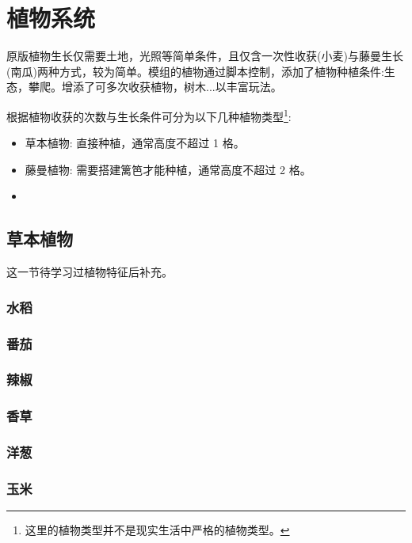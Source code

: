 \section{植物系统}

原版植物生长仅需要土地，光照等简单条件，且仅含一次性收获(小麦)与藤曼生长(南瓜)两种方式，较为简单。模组的植物通过脚本控制，添加了植物种植条件:生态，攀爬。增添了可多次收获植物，树木...以丰富玩法。

根据植物收获的次数与生长条件可分为以下几种植物类型\footnote{这里的植物类型并不是现实生活中严格的植物类型。}:
\begin{itemize}
    \item 草本植物: 直接种植，通常高度不超过 1 格。
    \item 藤曼植物: 需要搭建篱笆才能种植，通常高度不超过 2 格。
    \item 
\end{itemize}

\subsection{草本植物}

这一节待学习过植物特征后补充。

\subsubsection{水稻}

\subsubsection{番茄}

\subsubsection{辣椒}

\subsubsection{香草}

\subsubsection{洋葱}

\subsubsection{玉米}
\newpage